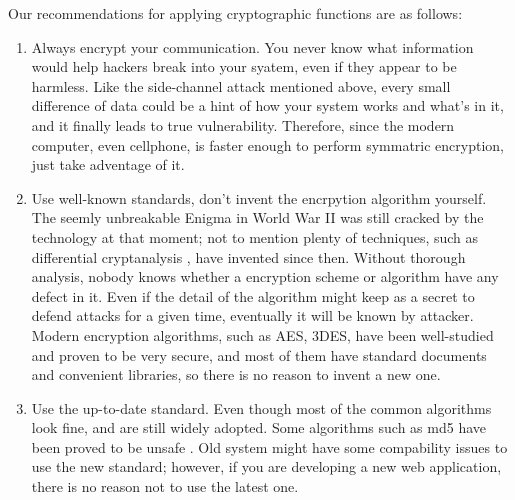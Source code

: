 \documentclass[conference]{IEEEtran}
\begin{document}
Our recommendations for applying cryptographic functions are as follows:
\begin{enumerate}[label=\textbf{\arabic*.}]
    \item
Always encrypt your communication. You never know what information would help hackers
break into your syatem, even if they appear to be harmless. Like the side-channel
attack mentioned above, every small difference of data could be a hint of
how your system works and what's in it, and it finally leads to
true vulnerability. Therefore, since the modern computer, even cellphone,
is faster enough to perform symmatric encryption, just take adventage of it.

    \item
Use well-known standards, don't invent the encrpytion algorithm yourself.
The seemly unbreakable Enigma \cite{enigma} in World War II was still cracked by
the technology at that moment; not to mention plenty of techniques,
such as differential cryptanalysis \cite{diff_crypto},
have invented since then. Without thorough analysis, nobody knows
whether a encryption scheme or algorithm
have any defect in it. Even if the detail of the algorithm might
keep as a secret to defend attacks for a given time,
eventually it will be known by attacker.
Modern encryption algorithms, such as AES, 3DES, have been well-studied and proven to be
very secure, and most of them have standard documents and convenient libraries,
so there is no reason to invent a new one.

    \item
Use the up-to-date standard. Even though most of the common algorithms look
fine, and are still widely adopted.
Some algorithms such as md5 have been proved to be unsafe \cite{md5_break}.
Old system might have some compability issues to use the new standard;
however, if you are developing a new web application, there is no reason
not to use the latest one.


\end{enumerate}
\end{document}
